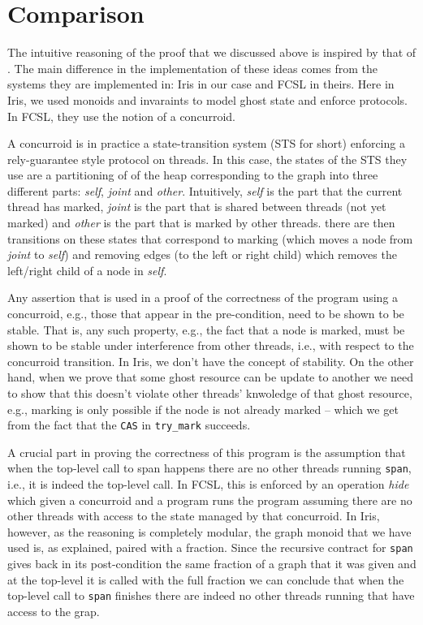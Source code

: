\documentclass[nocopyrightspace]{sigplanconf}
\def\MyMLe{\lstinline[language=MyML, basicstyle=\small\ttfamily]}
\begin{document}
\section{Comparison}
The intuitive reasoning of the proof that we discussed above is inspired by that of \cite{Sergey:2015:MVF:2737924.2737964}.
The main difference in the implementation of these ideas comes from the
systems they are implemented in: Iris in our case and FCSL in theirs.
Here in Iris, we used monoids and invaraints to model ghost state and
enforce protocols.
In FCSL, they use the notion of a concurroid.

A concurroid is in practice a state-transition system (STS for short)
enforcing a rely-guarantee style protocol on threads.
In this case, the states of the STS they use are a partitioning of of the
heap corresponding to the graph into three different parts:
\textit{self}, \textit{joint} and \textit{other}.
Intuitively, \textit{self} is the part that the current thread has marked,
\textit{joint} is the part that is shared between threads (not yet marked)
and \textit{other} is the part that is marked by other threads.
there are then transitions on these states that correspond to marking
(which moves a node from \textit{joint} to \textit{self}) and removing
edges (to the left or right child) which removes the left/right child of a
node in \textit{self}.

Any assertion that is used in a proof of the correctness of the program
using a concurroid, e.g., those that appear in the pre-condition,
need to be shown to be stable.
That is, any such property, e.g., the fact that a node is marked, must be
shown to be stable under interference from other threads, i.e., with
respect to the concurroid transition.
In Iris, we don't have the concept of stability.
On the other hand, when we prove that some ghost resource can be
update to another we need to show that this doesn't violate other
threads' knwoledge of that ghost resource, e.g., marking is only possible
if the node is not already marked -- which we get from the fact that the \MyMLe|CAS| in \MyMLe|try_mark| succeeds.

A crucial part in proving the correctness of this program is the
assumption that when the top-level call to span happens there are
no other threads running \MyMLe|span|, i.e., it is indeed the top-level call.
In FCSL, this is enforced by an operation \textit{hide} which given a
concurroid and a program runs the program assuming there are no
other threads with access to the state managed by that concurroid.
In Iris, however, as the reasoning is completely modular, the graph
monoid that we have used is, as explained, paired with a fraction.
Since the recursive contract for \MyMLe|span| gives back in its
post-condition the same fraction of a graph that it was given and at
the top-level it is called with the full fraction we can conclude that
when the top-level call to \MyMLe|span| finishes there are indeed no
other threads running that have access to the grap.
\end{document}
